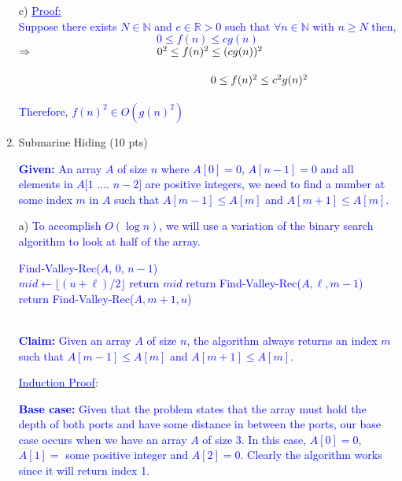 \documentclass[11pt]{article}
\renewcommand{\blacksquare}{\textcolor{blue}{\openbox}}
\begin{document}
\begin{enumerate}
{}
c) \textcolor{blue}{\underline{Proof:}\\
\-\hspace{1.5cm}Suppose there exists ${N \in \mathbb{N}}$ and ${c \in \mathbb{R} > 0}$ such that ${\forall n \in \mathbb{N}}$ with ${n \geq N}$ then, $$0 \leq f(n) \leq cg(n)$$ 
\-\hspace{1.5cm}${\Rightarrow \-\hspace{3.95cm} 0^2 \leq f(n)^2 \leq (cg(n))^2}$\\
\- \\
${\-\hspace{6.1cm} 0 \leq f(n)^2 \leq c^2g(n)^2}$\\
\- \\
\-\hspace{1.5cm} Therefore, ${f(n)^2 \in O(g(n)^2)}$\-\hspace{9cm}\blacksquare
}
\item Submarine Hiding (10 pts)

\textcolor{blue}{ {\bf Given:} An array $A$ of size $n$ where $A[0] = 0$, $A[n - 1] = 0$ and all elements in $A[1$ .... $n-2]$ are positive integers, we need to find a number at some index $m$ in $A$ such that $A[m - 1] \leq A[m]$ and $A[m + 1] \leq A[m]$.
}

a)
\textcolor{blue}{ To accomplish $O(\log n)$, we will use a variation of the binary search algorithm to look at half of the array. 
}
\- \\
\textcolor{blue}{
\begin{algorithmic}[1]
	\State Find-Valley-Rec($A$, 0, $n-1$)
\EndFunction
\\
 \State ${mid \gets \lfloor (u + \ell)/2  \rfloor}$
	\State return $mid$
	\State return Find-Valley-Rec($A, \ell, m - 1$)
\Else 
	\State return Find-Valley-Rec($A, m + 1, u$)
\EndIf 
\EndFunction
\end{algorithmic}
}
\- \\
\textcolor{blue}{{\bf Claim:} Given an array $A$ of size $n$, the algorithm always returns an index $m$ such that $A[m - 1] \leq A[m]$ and $A[m + 1] \leq A[m]$.}

\textcolor{blue}{ \underline{Induction Proof}:}

\textcolor{blue}{{\bf Base case:} Given that the problem states that the array must hold the depth of both ports and have some distance in between the ports, our base case occurs when we have an array $A$ of size 3. In this case, $A[0] = 0$, $A[1] =$ some positive integer and $A[2] = 0$. Clearly the algorithm works since it will return index 1.}


\end{enumerate}
\end{document}
